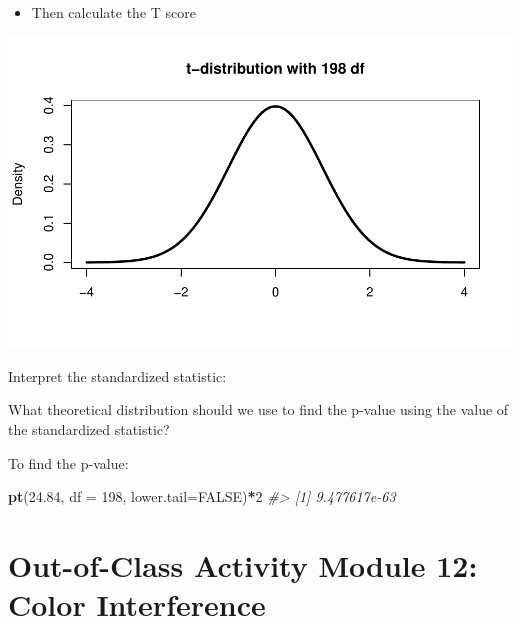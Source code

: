 \documentclass[
]{report}
\newenvironment{Shaded}{\begin{snugshade}}{\end{snugshade}}
\newcommand{\AttributeTok}[1]{\textcolor[rgb]{0.13,0.29,0.53}{#1}}
\newcommand{\CommentTok}[1]{\textcolor[rgb]{0.56,0.35,0.01}{\textit{#1}}}
\newcommand{\ConstantTok}[1]{\textcolor[rgb]{0.56,0.35,0.01}{#1}}
\newcommand{\DecValTok}[1]{\textcolor[rgb]{0.00,0.00,0.81}{#1}}
\newcommand{\FloatTok}[1]{\textcolor[rgb]{0.00,0.00,0.81}{#1}}
\newcommand{\FunctionTok}[1]{\textcolor[rgb]{0.13,0.29,0.53}{\textbf{#1}}}
\newcommand{\NormalTok}[1]{#1}
\newcommand{\SpecialCharTok}[1]{\textcolor[rgb]{0.81,0.36,0.00}{\textbf{#1}}}
\providecommand{\tightlist}{%
  \setlength{\itemsep}{0pt}\setlength{\parskip}{0pt}}
\begin{document}
\vspace{0.5in}

\begin{itemize}
\tightlist
\item
  Then calculate the T score
\end{itemize}

\vspace{0.5in}

\begin{center}\includegraphics[width=0.7\linewidth]{11-LN011-paired_files/figure-latex/pvalueheight-1} \end{center}

Interpret the standardized statistic:

\vspace{0.8in}

What theoretical distribution should we use to find the p-value using the value of the standardized statistic?

\vspace{0.3in}

To find the p-value:

\begin{Shaded}
\begin{Highlighting}[]
\FunctionTok{pt}\NormalTok{(}\FloatTok{24.84}\NormalTok{, }\AttributeTok{df =} \DecValTok{198}\NormalTok{, }\AttributeTok{lower.tail=}\ConstantTok{FALSE}\NormalTok{)}\SpecialCharTok{*}\DecValTok{2}
\CommentTok{\#\textgreater{} [1] 9.477617e{-}63}
\end{Highlighting}
\end{Shaded}

\newpage

\hypertarget{out-of-class-activity-module-12-color-interference}{%
\section{Out-of-Class Activity Module 12: Color Interference}\label{out-of-class-activity-module-12-color-interference}}
\end{document}
